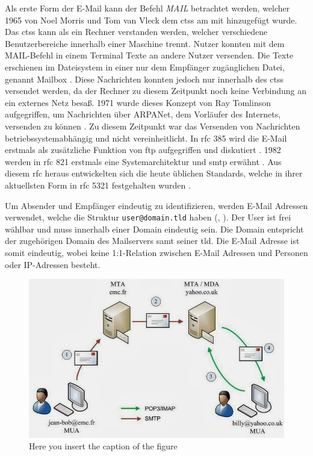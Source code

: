 Als erste Form der E-Mail kann der Befehl \textit{MAIL} betrachtet werden, welcher 1965 von Noel Morris und Tom van Vleck dem \acrfull{ctss} am \acrshort{mit} hinzugefügt wurde. Das \acrshort{ctss} kann als ein Rechner verstanden werden, welcher verschiedene Benutzerbereiche innerhalb einer Maschine trennt. Nutzer konnten mit dem MAIL-Befehl in einem Terminal Texte an andere Nutzer versenden. Die Texte erschienen im Dateisystem in einer nur dem Empfänger zugänglichen Datei, genannt Mailbox \citep[S. 4]{Vleck2012}. Diese Nachrichten konnten jedoch nur innerhalb des \acrshort{ctss} versendet werden, da der Rechner zu diesem Zeitpunkt noch keine Verbindung an ein externes Netz besaß. 1971 wurde dieses Konzept von Ray Tomlinson aufgegriffen, um Nachrichten über ARPANet, dem Vorläufer des Internets, versenden zu können \citep[S. 4 ff.]{Partridge2008}. Zu diesem Zeitpunkt war das Versenden von Nachrichten betriebssystemabhängig und nicht vereinheitlicht. In \acrshort{rfc} 385 wird die E-Mail erstmals als zusätzliche Funktion von \acrshort{ftp} aufgegriffen und diskutiert \citep[S. 3 f.]{RFC385}. 1982 werden in \acrshort{rfc} 821 erstmals eine Systemarchitektur und \acrshort{smtp} erwähnt \citep[S. 2 ff.]{RFC821}. Aus diesem \acrshort{rfc} heraus entwickelten sich die heute üblichen Standards, welche in ihrer aktuellsten Form in \acrshort{rfc} 5321 festgehalten wurden \citep{RFC5321}.

Um Absender und Empfänger eindeutig zu identifizieren, werden E-Mail Adressen verwendet, welche die Struktur \texttt{user@domain.tld} haben (\cite[S. 4 f.]{RFC822}, \cite[S. 2 ff.]{RFC2142}). Der User ist frei wählbar und muss innerhalb einer Domain eindeutig sein. Die Domain entspricht der zugehörigen Domain des Mailservers samt seiner \acrfull{tld}. Die E-Mail Adresse ist somit eindeutig, wobei keine 1:1-Relation zwischen E-Mail Adressen und Personen oder IP-Adressen besteht.

\begin{figure}[!ht]
	\centering
		\includegraphics[width=1\textwidth]{Figures/mail_architektur.jpg}
	\caption{Here you insert the caption of the figure}
	\label{fig:mail_architektur}
\end{figure}


